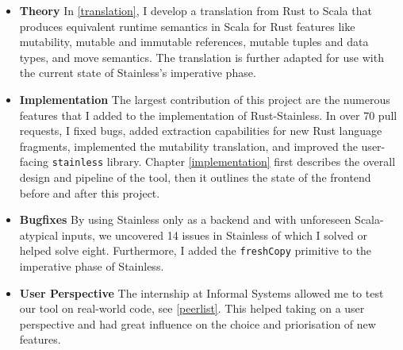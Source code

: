 \begin{itemize}

\item \textbf{Theory} In \autoref{translation}, I develop a translation from
Rust to Scala that produces equivalent runtime semantics in Scala for Rust
features like mutability, mutable and immutable references, mutable tuples and
data types, and move semantics. The translation is further adapted for use with
the current state of Stainless's imperative phase.

\item \textbf{Implementation} The largest contribution of this project are the
numerous features that I added  to the implementation of Rust-Stainless. In over
70 pull requests, I fixed bugs, added extraction capabilities for new Rust
language fragments, implemented the mutability translation, and improved the
user-facing \lstinline!stainless! library. Chapter \ref{implementation} first
describes the overall design and pipeline of the tool, then it outlines the
state of the frontend before and after this project.

\item \textbf{Bugfixes} By using Stainless only as a backend and with unforeseen
Scala-atypical inputs, we uncovered 14 issues in Stainless of which I solved or
helped solve eight. Furthermore, I added the \lstinline!freshCopy! primitive to
the imperative phase of Stainless.

\item \textbf{User Perspective} The internship at Informal Systems allowed me to
test our tool on real-world code, see \autoref{peerlist}. This helped taking on
a user perspective and had great influence on the choice and priorisation of new
features.

\end{itemize}
